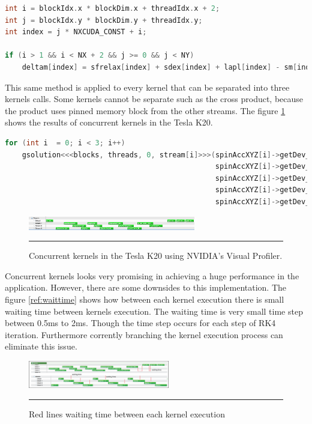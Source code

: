 \begin{lstlisting}[language=C++, label={lst:consingle}, caption={Evaluation of individual coordinates of the Zhang and Li model}]
int i = blockIdx.x * blockDim.x + threadIdx.x + 2;
int j = blockIdx.y * blockDim.y + threadIdx.y;
int index = j * NXCUDA_CONST + i;

if (i > 1 && i < NX + 2 && j >= 0 && j < NY)
	deltam[index] = sfrelax[index] + sdex[index] + lapl[index] - sm[index];
\end{lstlisting}

This same method is applied to every kernel that can be separated into three kernels calls. Some kernels cannot be separate such as the cross product, because the product uses pinned memory block from the other streams.  The figure \ref{fig:concurrent} shows the results of concurrent kernels in the Tesla K20.
\begin{lstlisting}[language=C++, caption={Evaluate Zhang and Li model.}]
for (int i  = 0; i < 3; i++)
	gsolution<<<blocks, threads, 0, stream[i]>>>(spinAccXYZ[i]->getDev_deltam(),
												 spinAccXYZ[i]->getDev_sfrelax(), 
												 spinAccXYZ[i]->getDev_sm(), 
											 	 spinAccXYZ[i]->getDev_sdex(),
											 	 spinAccXYZ[i]->getDev_lapl());
\end{lstlisting}

\begin{figure}[htbp]
	\centering
		\includegraphics[width=0.65\textwidth]{Figures/concurent.png}
		\rule{35em}{0.2pt}
	\caption[Streams kernels Tesla K20]{Concurrent kernels in the Tesla K20 using NVIDIA's Visual Profiler.}
	\label{fig:concurrent}
\end{figure}

Concurrent kernels  looks very promising in achieving a huge performance in the application. However, there are some downsides to this implementation. The figure \ref{ref:waittime} shows how between each kernel execution there is small waiting time between kernels execution. The waiting time is very small time step between 0.5ms to 2ms. Though the time step occurs for each step of RK4 iteration. Furthermore corrently branching the kernel execution process can eliminate this issue.

\begin{figure}[htbp]
	\centering
		\includegraphics[width=0.55\textwidth]{Figures/waittime.png}
		\rule{35em}{0.2pt}
	\caption[Waiting time concurrent kernels]{Red lines waiting time between each kernel execution
}
	\label{fig:waittime}
\end{figure}


